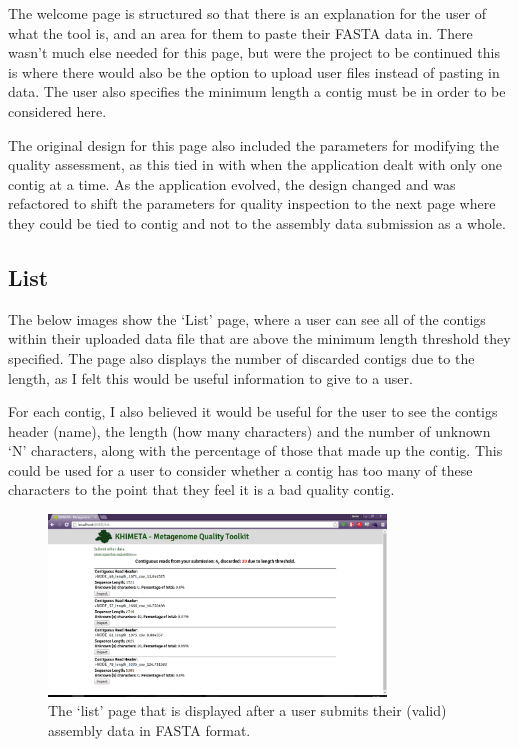 The welcome page is structured so that there is an explanation for the user of what the tool is, and an area for them to paste their FASTA data in. There wasn't much else needed for this page, but were the project to be continued this is where there would also be the option to upload user files instead of pasting in data. The user also specifies the minimum length a contig must be in order to be considered here.

The original design for this page also included the parameters for modifying the quality assessment, as this tied in with when the application dealt with only one contig at a time. As the application evolved, the design changed and was refactored to shift the parameters for quality inspection to the next page where they could be tied to contig and not to the assembly data submission as a whole.

\subsection{List}
The below images show the `List' page, where a user can see all of the contigs within their uploaded data file that are above the minimum length threshold they specified. The page also displays the number of discarded contigs due to the length, as I felt this would be useful information to give to a user.

For each contig, I also believed it would be useful for the user to see the contigs header (name), the length (how many characters) and the number of unknown `N' characters, along with the percentage of those that made up the contig. This could be used for a user to consider whether a contig has too many of these characters to the point that they feel it is a bad quality contig.
\begin{figure}[H]
	\centering
\includegraphics[width=0.8\textwidth]{images/ui2}
\caption{The `list' page that is displayed after a user submits their (valid) assembly data in FASTA format.}
\end{figure}

